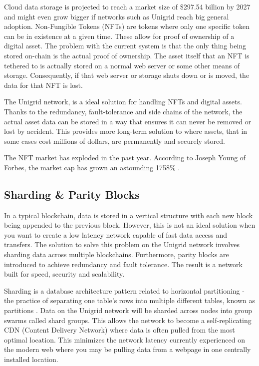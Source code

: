 \documentclass{article}
\begin{document}
\noindent Cloud data storage is projected to reach a market size of \$297.54 billion by 2027 \cite{fort2021} and might even grow bigger if networks such as Unigrid reach big general adoption. Non-Fungible Tokens (NFTs) are tokens where only one specific token can be in existence at a given time. These allow for proof of ownership of a digital asset. The problem with the current system is that the only thing being stored on-chain is the actual proof of ownership. The asset itself that an NFT is tethered to is actually stored on a normal web server or some other means of storage. Consequently, if that web server or storage shuts down or is moved, the data for that NFT is lost.

The Unigrid network, is a ideal solution for handling NFTs and digital assets. Thanks to the redundancy, fault-tolerance and side chains of the network, the actual asset data can be stored in a way that ensures it can never be removed or lost by accident. This provides more long-term solution to where assets, that in some cases cost millions of dollars, are permanently and securely stored.

The NFT market has exploded in the past year. According to Joseph Young of Forbes, the market cap has grown an astounding 1758\% \cite{young2021}.

\subsection{Sharding \& Parity Blocks}
In a typical blockchain, data is stored in a vertical structure with each new block being appended to the previous block. However, this is not an ideal solution when you want to create a low latency network capable of fast data access and transfers. The solution to solve this problem on the Unigrid network involves sharding data across multiple blockchains. Furthermore, parity blocks are introduced to achieve redundancy and fault tolerance. The result is a network built for speed, security and scalability.

Sharding is a database architecture pattern related to horizontal partitioning - the practice of separating one table’s rows into multiple different tables, known as partitions \cite{mark2019}. Data on the Unigrid network will be sharded across nodes into group swarms called shard groups. This allows the network to become a self-replicating CDN (Content Delivery Network) where data is often pulled from the most optimal location. This minimizes the network latency currently experienced on the modern web where you may be pulling data from a webpage in one centrally installed location.
\end{document}
